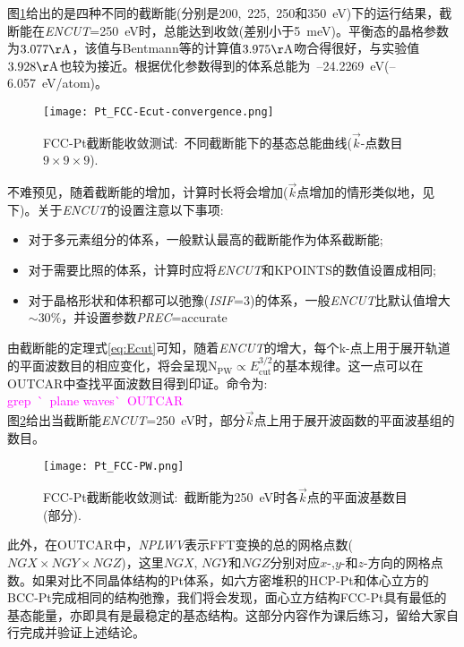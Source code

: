 图\ref{Pt_FCC-energy-curve}给出的是四种不同的截断能(分别是200,~225,~250和350\textrm{~eV})下的运行结果，截断能在\textit{ENCUT}=250\textrm{~eV}时，总能达到收敛(差别小于5\textrm{~meV})。平衡态的晶格参数为$3.077\mathrm{\AA}$，该值与\textrm{Bentmann}等的计算值$3.975\mathrm{\AA}$\cite{PRB78-205302_2008}吻合得很好，与实验值$3.928\mathrm{\AA}$\cite{Kittel}也较为接近。根据优化参数得到的体系总能为~--24.2269\textrm{~eV}(--6.057\textrm{~eV/atom})。
\begin{figure}[h!]
\centering
\texttt{[image: Pt\_FCC-Ecut-convergence.png]}
\caption{\small \textrm{FCC-Pt}截断能收敛测试:~不同截断能下的基态总能曲线($\vec k$-点数目$9\times9\times9$).}%
\label{Pt_FCC-energy-curve}
\end{figure}

不难预见，随着截断能的增加，计算时长将会增加($\vec k$点增加的情形类似地，见下)。关于\textit{ENCUT}的设置注意以下事项:
\begin{itemize}
	\item 对于多元素组分的体系，一般默认最高的截断能作为体系截断能;
	\item 对于需要比照的体系，计算时应将\textit{ENCUT}和\textrm{KPOINTS}的数值设置成相同;
	\item 对于晶格形状和体积都可以弛豫(\textit{ISIF}=3)的体系，一般\textit{ENCUT}比默认值增大$\sim30\%$，并设置参数\textit{PREC}=\textrm{accurate}
\end{itemize}

由截断能的定理式\eqref{eq:Ecut}可知，随着\textit{ENCUT}的增大，每个\textrm{k}-点上用于展开轨道的平面波数目的相应变化，将会呈现$\mathrm{N}_{\mathrm{PW}}\propto E_{\mathrm{cut}}^{3/2}$的基本规律。这一点可以在\textrm{OUTCAR}中查找平面波数目得到印证。命令为:~\\
\textcolor{magenta}{\textrm{grep~\`~plane waves\`~OUTCAR}}\\
图\ref{Pt_FCC-PW}给出当截断能\textit{ENCUT}=250\textrm{~eV}时，部分$\vec k$点上用于展开波函数的平面波基组的数目。
\begin{figure}[h!]
\centering
\vskip -8pt
\texttt{[image: Pt\_FCC-PW.png]}
\caption{\small \textrm{FCC-Pt}截断能收敛测试:~截断能为250\textrm{~eV}时各$\vec k$点的平面波基数目(部分).}%
\label{Pt_FCC-PW}
\end{figure}

此外，在\textrm{OUTCAR}中，\textit{NPLWV}表示\textrm{FFT}变换的总的网格点数($\mathit{NGX}\times\mathit{NGY}\times\mathit{NGZ}$)，这里$\mathit{NGX}$, $\mathit{NGY}$和$\mathit{NGZ}$分别对应$x$-,$y$-和$z$-方向的网格点数。如果对比不同晶体结构的\textrm{Pt}体系，如六方密堆积的\textrm{HCP-Pt}和体心立方的\textrm{BCC-Pt}完成相同的结构弛豫，我们将会发现，面心立方结构\textrm{FCC-Pt}具有最低的基态能量，亦即具有是最稳定的基态结构。这部分内容作为课后练习，留给大家自行完成并验证上述结论。

